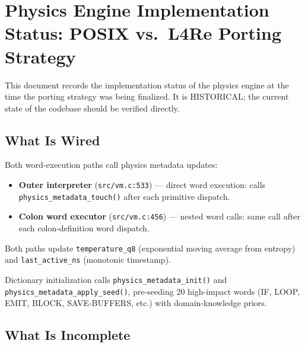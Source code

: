 
\section{Physics Engine Implementation Status: POSIX vs.\ L4Re Porting Strategy}

This document records the implementation status of the physics engine at
the time the porting strategy was being finalized. It is HISTORICAL;
the current state of the codebase should be verified directly.

\subsection{What Is Wired}

Both word-execution paths call physics metadata updates:

\begin{itemize}
  \item \textbf{Outer interpreter} (\texttt{src/vm.c:533}) — direct word
        execution: calls \texttt{physics\_metadata\_touch()} after each
        primitive dispatch.
  \item \textbf{Colon word executor} (\texttt{src/vm.c:456}) — nested word
        calls: same call after each colon-definition word dispatch.
\end{itemize}

Both paths update \texttt{temperature\_q8} (exponential moving average from
entropy) and \texttt{last\_active\_ns} (monotonic timestamp).

Dictionary initialization calls \texttt{physics\_metadata\_init()} and
\texttt{physics\_metadata\_apply\_seed()}, pre-seeding 20 high-impact words
(IF, LOOP, EMIT, BLOCK, SAVE-BUFFERS, etc.) with domain-knowledge priors.

\subsection{What Is Incomplete}

